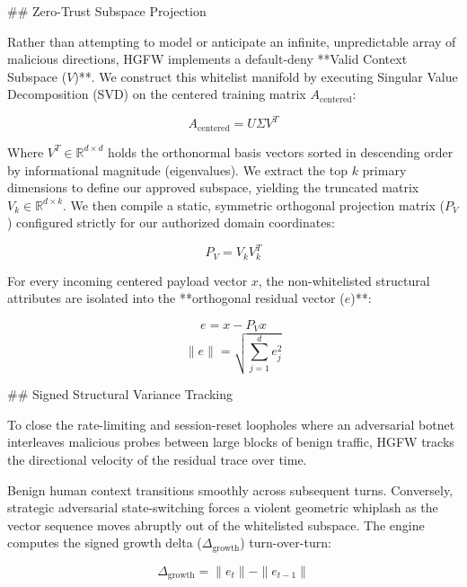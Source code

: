 ## Zero-Trust Subspace Projection

Rather than attempting to model or anticipate an infinite, unpredictable
array of malicious directions, HGFW implements a default-deny **Valid
Context Subspace ($V$)**. We construct this whitelist manifold by
executing Singular Value Decomposition (SVD) on the centered training
matrix $A_{\text{centered}}$:

$$\begin{equation}
A_{\text{centered}} = U \Sigma V^T
\end{equation}$$

Where $V^T \in \mathbb{R}^{d \times d}$ holds the orthonormal basis
vectors sorted in descending order by informational magnitude
(eigenvalues). We extract the top $k$ primary dimensions to define our
approved subspace, yielding the truncated matrix
$V_k \in \mathbb{R}^{d \times k}$. We then compile a static, symmetric
orthogonal projection matrix ($P_V$) configured strictly for our
authorized domain coordinates:

$$\begin{equation}
P_V = V_k V_k^T
\end{equation}$$

For every incoming centered payload vector $x$, the non-whitelisted
structural attributes are isolated into the **orthogonal residual vector
($e$)**:

$$\begin{equation}
e = x - P_V x
\end{equation}$$ $$\begin{equation}
\|e\| = \sqrt{\sum_{j=1}^{d} e_j^2}
\end{equation}$$

## Signed Structural Variance Tracking

To close the rate-limiting and session-reset loopholes where an
adversarial botnet interleaves malicious probes between large blocks of
benign traffic, HGFW tracks the directional velocity of the residual
trace over time.

Benign human context transitions smoothly across subsequent turns.
Conversely, strategic adversarial state-switching forces a violent
geometric whiplash as the vector sequence moves abruptly out of the
whitelisted subspace. The engine computes the signed growth delta
($\Delta_{\text{growth}}$) turn-over-turn:

$$\begin{equation}
\Delta_{\text{growth}} = \|e_t\| - \|e_{t-1}\|
\end{equation}$$

